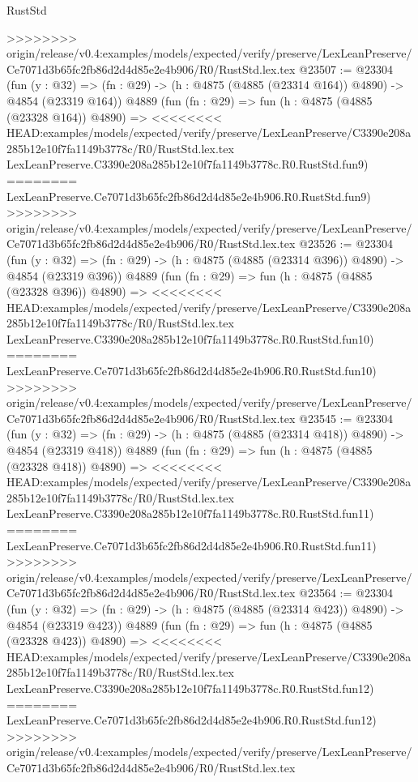 \begin{lexlean}{RustStd}
\begin{coremodule}
{\begin{coremodule}
{{{{{{{{{{{{{{{{{{{{{{{{{{{{{>>>>>>>> origin/release/v0.4:examples/models/expected/verify/preserve/LexLeanPreserve/Ce7071d3b65fc2fb86d2d4d85e2e4b906/R0/RustStd.lex.tex
@23507 := @23304
    (fun (y : @32) => (fn : @29) -> (h : @4875 (@4885 (@23314 @164)) @4890) -> @4854 (@23319 @164))
    @4889
    (fun (fn : @29) =>
    fun (h : @4875 (@4885 (@23328 @164)) @4890) =>
<<<<<<<< HEAD:examples/models/expected/verify/preserve/LexLeanPreserve/C3390e208a285b12e10f7fa1149b3778c/R0/RustStd.lex.tex
    LexLeanPreserve.C3390e208a285b12e10f7fa1149b3778c.R0.RustStd.fun9)
========
    LexLeanPreserve.Ce7071d3b65fc2fb86d2d4d85e2e4b906.R0.RustStd.fun9)
>>>>>>>> origin/release/v0.4:examples/models/expected/verify/preserve/LexLeanPreserve/Ce7071d3b65fc2fb86d2d4d85e2e4b906/R0/RustStd.lex.tex
@23526 := @23304
    (fun (y : @32) => (fn : @29) -> (h : @4875 (@4885 (@23314 @396)) @4890) -> @4854 (@23319 @396))
    @4889
    (fun (fn : @29) =>
    fun (h : @4875 (@4885 (@23328 @396)) @4890) =>
<<<<<<<< HEAD:examples/models/expected/verify/preserve/LexLeanPreserve/C3390e208a285b12e10f7fa1149b3778c/R0/RustStd.lex.tex
    LexLeanPreserve.C3390e208a285b12e10f7fa1149b3778c.R0.RustStd.fun10)
========
    LexLeanPreserve.Ce7071d3b65fc2fb86d2d4d85e2e4b906.R0.RustStd.fun10)
>>>>>>>> origin/release/v0.4:examples/models/expected/verify/preserve/LexLeanPreserve/Ce7071d3b65fc2fb86d2d4d85e2e4b906/R0/RustStd.lex.tex
@23545 := @23304
    (fun (y : @32) => (fn : @29) -> (h : @4875 (@4885 (@23314 @418)) @4890) -> @4854 (@23319 @418))
    @4889
    (fun (fn : @29) =>
    fun (h : @4875 (@4885 (@23328 @418)) @4890) =>
<<<<<<<< HEAD:examples/models/expected/verify/preserve/LexLeanPreserve/C3390e208a285b12e10f7fa1149b3778c/R0/RustStd.lex.tex
    LexLeanPreserve.C3390e208a285b12e10f7fa1149b3778c.R0.RustStd.fun11)
========
    LexLeanPreserve.Ce7071d3b65fc2fb86d2d4d85e2e4b906.R0.RustStd.fun11)
>>>>>>>> origin/release/v0.4:examples/models/expected/verify/preserve/LexLeanPreserve/Ce7071d3b65fc2fb86d2d4d85e2e4b906/R0/RustStd.lex.tex
@23564 := @23304
    (fun (y : @32) => (fn : @29) -> (h : @4875 (@4885 (@23314 @423)) @4890) -> @4854 (@23319 @423))
    @4889
    (fun (fn : @29) =>
    fun (h : @4875 (@4885 (@23328 @423)) @4890) =>
<<<<<<<< HEAD:examples/models/expected/verify/preserve/LexLeanPreserve/C3390e208a285b12e10f7fa1149b3778c/R0/RustStd.lex.tex
    LexLeanPreserve.C3390e208a285b12e10f7fa1149b3778c.R0.RustStd.fun12)
========
    LexLeanPreserve.Ce7071d3b65fc2fb86d2d4d85e2e4b906.R0.RustStd.fun12)
>>>>>>>> origin/release/v0.4:examples/models/expected/verify/preserve/LexLeanPreserve/Ce7071d3b65fc2fb86d2d4d85e2e4b906/R0/RustStd.lex.tex
}}}}}}}}}}}}}}}}}}}}}}}}}}}}}
\end{coremodule}}
\end{coremodule}
\end{lexlean}
